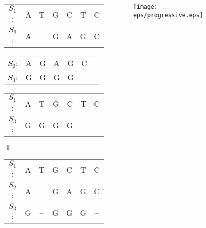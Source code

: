 \documentclass[xcolor=dvipsnames,envcountsect,handout]{beamer}
\begin{document}
\begin{frame}
\frametitle{}
\begin{columns}
\begin{column}[t]{6cm}
\vspace{-8pt}
\begin{table}[H]
\begin{exampleblock}{}
\begin{tabular}{c c c c c c c}
$S_1$: & A & T  & G & C & T & C  \\
$S_2$: & A & -- & G & A & G & C  
\end{tabular}
\end{exampleblock}
\vspace{-10pt}
\begin{exampleblock}{}
\begin{tabular}{c c c c c c c}
$S_2$: & A & G & A & G & C   &    \\
$S_3$: & G & G & G & G & --  &    
\end{tabular}
\end{exampleblock}
\vspace{-10pt}
\begin{exampleblock}{}
\begin{tabular}{c c c c c c c}
$S_1$: & A & T & G & C & T   & C  \\
$S_3$: & G & G & G & G & --  & -- 
\end{tabular}
\end{exampleblock}
$\Downarrow$
\begin{alertblock}{}
\begin{tabular}{c c c c c c c}
$S_1$: & A & T  & G & C & T & C  \\
$S_2$: & A & -- & G & A & G & C  \\
$S_3$: & G & \alert{--} & G & G & G & -- 
\end{tabular}
\end{alertblock}
\end{table}
\end{column}
\begin{column}[t]{5cm}
\vspace{20pt}
\begin{figure}[H]
\centering
\hspace{-12pt}
\texttt{[image: eps/progressive.eps]}
\end{figure}
\end{column}
\end{columns}
\end{frame}
\end{document}
